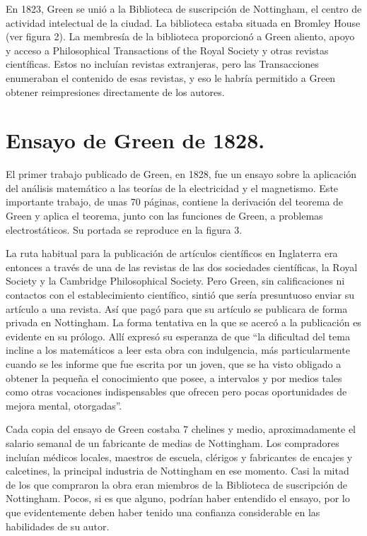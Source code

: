 \par
En 1823, Green se unió a la Biblioteca de suscripción de Nottingham, el centro de actividad intelectual de la ciudad. La biblioteca estaba situada en Bromley House (ver figura 2). La membresía de la biblioteca proporcionó a Green aliento, apoyo y acceso a Philosophical Transactions of the Royal Society y otras revistas científicas. Estos no incluían revistas extranjeras, pero las Transacciones enumeraban el contenido de esas revistas, y eso le habría permitido a Green obtener reimpresiones directamente de los autores.

\section{Ensayo de Green de 1828.}

El primer trabajo publicado de Green, en 1828, fue un ensayo sobre la aplicación del análisis matemático a las teorías de la electricidad y el magnetismo. Este importante trabajo, de unas 70 páginas, contiene la derivación del teorema de Green y aplica el teorema, junto con las funciones de Green, a problemas electrostáticos. Su portada se reproduce en la figura 3.
\par
La ruta habitual para la publicación de artículos científicos en Inglaterra era entonces a través de una de las revistas de las dos sociedades científicas, la Royal Society y la Cambridge Philosophical Society. Pero Green, sin calificaciones ni contactos con el establecimiento científico, sintió que sería presuntuoso enviar su artículo a una revista. Así que pagó para que su artículo se publicara de forma privada en Nottingham. La forma tentativa en la que se acercó a la publicación es evidente en su prólogo. Allí expresó su esperanza de que \enquote{la dificultad del tema incline a los matemáticos a leer esta obra con indulgencia, más particularmente cuando se les informe que fue escrita por un joven, que se ha visto obligado a obtener la pequeña el conocimiento que posee, a intervalos y por medios tales como otras vocaciones indispensables que ofrecen pero pocas oportunidades de mejora mental, otorgadas}.
\par
Cada copia del ensayo de Green costaba 7 chelines y medio, aproximadamente el salario semanal de un fabricante de medias de Nottingham. Los compradores incluían médicos locales, maestros de escuela, clérigos y fabricantes de encajes y calcetines, la principal industria de Nottingham en ese momento. Casi la mitad de los que compraron la obra eran miembros de la Biblioteca de suscripción de Nottingham. Pocos, si es que alguno, podrían haber entendido el ensayo, por lo que evidentemente deben haber tenido una confianza considerable en las habilidades de su autor.
